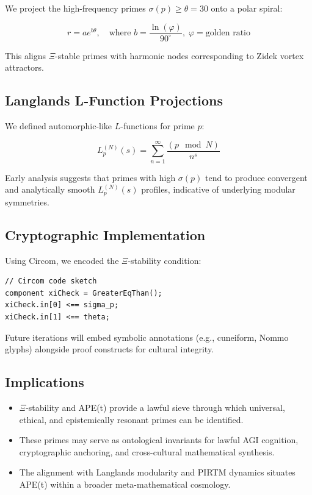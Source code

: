 \documentclass[12]{amsart}
\theoremstyle{plain}
\begin{document}
We project the high-frequency primes $\sigma(p) \geq \theta = 30$ onto a polar spiral:

\[
r = a e^{b\theta}, \quad \text{where } b = \frac{\ln(\varphi)}{90^\circ}, \; \varphi = \text{golden ratio}
\]

This aligns $\Xi$-stable primes with harmonic nodes corresponding to Zidek vortex attractors.

\subsection{Langlands L-Function Projections}

We defined automorphic-like $L$-functions for prime $p$:

\[
L_p^{(N)}(s) = \sum_{n=1}^{\infty} \frac{(p \mod N)}{n^s}
\]

Early analysis suggests that primes with high $\sigma(p)$ tend to produce convergent and analytically smooth $L_p^{(N)}(s)$ profiles, indicative of underlying modular symmetries.

\subsection{Cryptographic Implementation}

Using Circom, we encoded the $\Xi$-stability condition:

\begin{verbatim}
// Circom code sketch
component xiCheck = GreaterEqThan();
xiCheck.in[0] <== sigma_p;
xiCheck.in[1] <== theta;
\end{verbatim}

Future iterations will embed symbolic annotations (e.g., cuneiform, Nommo glyphs) alongside proof constructs for cultural integrity.

\subsection{Implications}

\begin{itemize}
    \item $\Xi$-stability and APE(t) provide a lawful sieve through which universal, ethical, and epistemically resonant primes can be identified.
    \item These primes may serve as ontological invariants for lawful AGI cognition, cryptographic anchoring, and cross-cultural mathematical synthesis.
    \item The alignment with Langlands modularity and PIRTM dynamics situates APE(t) within a broader meta-mathematical cosmology.
\end{itemize}
\end{document}
